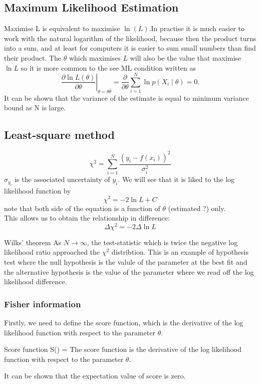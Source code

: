 \documentclass[12pt,a4paper]{article}
\begin{document}
\subsection{Maximum Likelihood Estimation}
Maximise L is equivalent to maximise $\ln(L)$.In practise it is much easier to work with the natural logarithm of the likelihood, because then the product turns into a sum, and at least for computers it is easier to sum small numbers than find their product. The $\hat{\theta}$ which maximises $L$ will also be the value that maximise $\ln L$ so it is more common to the see $\mathrm{ML}$ condition written as
\begin{equation*}
\left.\frac{\partial \ln L(\theta)}{\partial \theta}\right|_{\theta=\theta \hat{\theta}}=\frac{\partial}{\partial \theta} \sum_{i=1}^N \ln p\left(X_i \mid \theta\right)=0 .
\end{equation*}
It can be shown that the variance of the estimate is equal to minimum variance bound as N is large.
\subsection{Least-square method}
$$
\chi^2  = \sum_{i=1}^N \frac{(y_i - f(x_i))^2}{\sigma_i^2}
$$
$\sigma_{y_i}$ is the associated uncertainty of $y_i$.
We will see that it is liked to the log likelihood function by 
$$
\chi^2 = -2 \ln L + C
$$
note that both side of the equation is a function of $\theta$ (estimated ?) only.\\
This allows us to obtain the relationship in difference:
$$
{\Delta \chi^2}= -2  \Delta \ln L
$$
\begin{theorem}
    {Wilks' theorem}
    {As $N\rightarrow\infty $, the test-statistic which is twice the negative log likelihood ratio approached the $\chi^2$ distribtion. This is an example of hypothesis test where the null hypothesis is the valule of the parameter at the best fit and the alternative hypothesis is the value of the parameter where we read off the log likelihood difference.}
\end{theorem}
\subsubsection{Fisher information}

Firstly, we need to define the score function, which is the derivative of the log likelihood function with respect to the parameter $\theta$.

\begin{definition}
    {Score function}
    {S(\theta) = }
    {The score function is the derivative of the log likelihood function with respect to the parameter $\theta$.}
\end{definition}
It can be shown that the expectation value of score is zero.
\end{document}

